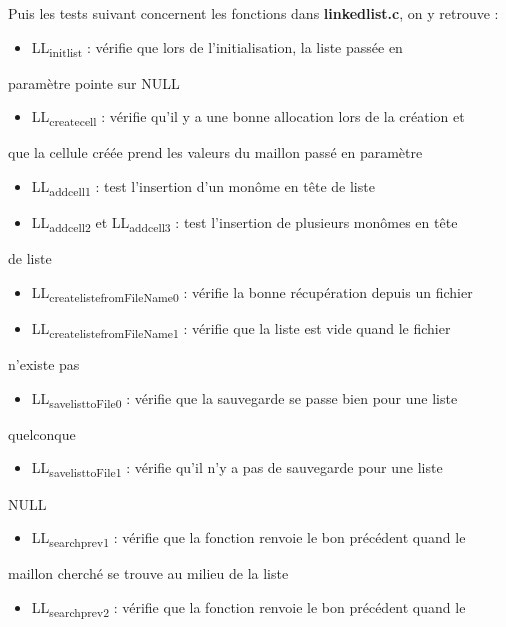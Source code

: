 \documentclass[11pt]{article}
\begin{document}
Puis les tests suivant concernent les fonctions dans \textbf{linkedlist.c}, on y
retrouve :
\begin{itemize}
\item LL\textsubscript{init}\textsubscript{list} : vérifie que lors de l'initialisation, la liste passée en
\end{itemize}
paramètre pointe sur NULL
\begin{itemize}
\item LL\textsubscript{create}\textsubscript{cell} : vérifie qu'il y a une bonne allocation lors de la création et
\end{itemize}
que la cellule créée prend les valeurs du maillon passé en paramètre
\begin{itemize}
\item LL\textsubscript{add}\textsubscript{cell1} : test l'insertion d'un monôme en tête de liste
\item LL\textsubscript{add}\textsubscript{cell2} et LL\textsubscript{add}\textsubscript{cell3} : test l'insertion de plusieurs monômes en tête
\end{itemize}
de liste
\begin{itemize}
\item LL\textsubscript{create}\textsubscript{listefromFileName0} : vérifie la bonne récupération depuis un fichier
\item LL\textsubscript{create}\textsubscript{listefromFileName1} : vérifie que la liste est vide quand le fichier
\end{itemize}
n'existe pas
\begin{itemize}
\item LL\textsubscript{save}\textsubscript{list}\textsubscript{toFile0} : vérifie que la sauvegarde se passe bien pour une liste
\end{itemize}
quelconque
\begin{itemize}
\item LL\textsubscript{save}\textsubscript{list}\textsubscript{toFile1} : vérifie qu'il n'y a pas de sauvegarde pour une liste
\end{itemize}
NULL
\begin{itemize}
\item LL\textsubscript{search}\textsubscript{prev1} : vérifie que la fonction renvoie le bon précédent quand le
\end{itemize}
maillon cherché se trouve au milieu de la liste
\begin{itemize}
\item LL\textsubscript{search}\textsubscript{prev2} : vérifie que la fonction renvoie le bon précédent quand le
\end{itemize}
\end{document}
